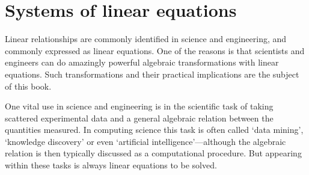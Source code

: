 
\chapter{Systems of linear equations}
\label{ch:sle}
\minitoc


Linear relationships are commonly identified in science and engineering, and commonly expressed as linear equations.
One of the reasons is that scientists and engineers can do amazingly powerful algebraic transformations with linear equations.
Such transformations and their practical implications are the subject of this book.

One vital use in science and engineering is in the scientific task of taking scattered experimental data and  a general algebraic relation between the quantities measured.
In computing science this task is often called `data mining', `knowledge discovery' or even `artificial intelligence'---although  the algebraic relation is then typically discussed as a computational procedure.
But appearing within these tasks is always linear equations to be solved.

